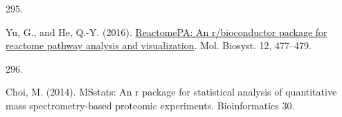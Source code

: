 \documentclass[
]{article}
\newlength{\cslhangindent}
\newlength{\csllabelwidth}
\newlength{\cslentryspacingunit} %
\newenvironment{CSLReferences}[2] %
 {%
  \setlength{\parindent}{0pt}
  \ifodd #1
  \let\oldpar\par
  \def\par{\hangindent=\cslhangindent\oldpar}
  \fi
  \setlength{\parskip}{#2\cslentryspacingunit}
 }%
 {}
\newcommand{\CSLLeftMargin}[1]{\parbox[t]{\csllabelwidth}{#1}}
\newcommand{\CSLRightInline}[1]{\parbox[t]{\linewidth - \csllabelwidth}{#1}\break}
\begin{document}
\begin{CSLReferences}{0}{0}
\leavevmode{}%
\CSLLeftMargin{295. }
\CSLRightInline{Yu, G., and He, Q.-Y. (2016). \href{https://doi.org/10.1039/C5MB00663E}{ReactomePA: An r/bioconductor package for reactome pathway analysis and visualization}. Mol. Biosyst. 12, 477--479.}

\leavevmode{}%
\CSLLeftMargin{296. }
\CSLRightInline{Choi, M. (2014). MSstats: An r package for statistical analysis of quantitative mass spectrometry-based proteomic experiments. Bioinformatics 30.}

\end{CSLReferences}
\end{document}
